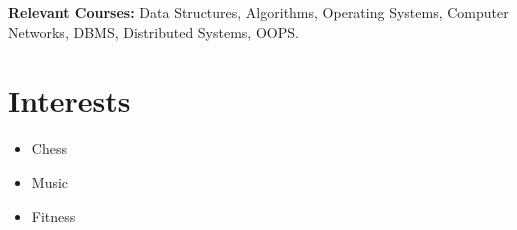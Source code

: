 \documentclass[a4paper,10pt]{article}
\newcommand{\resumeItem}[1]{\item\small{#1}}
\begin{document}
\vspace{4pt}
\textbf{Relevant Courses:} Data Structures, Algorithms, Operating Systems, Computer Networks, DBMS, Distributed Systems, OOPS.


\section*{Interests}
\begin{itemize}[leftmargin=*,itemsep=2pt]
  \resumeItem{Chess}
  \resumeItem{Music}
  \resumeItem{Fitness}
\end{itemize}
\end{document}
